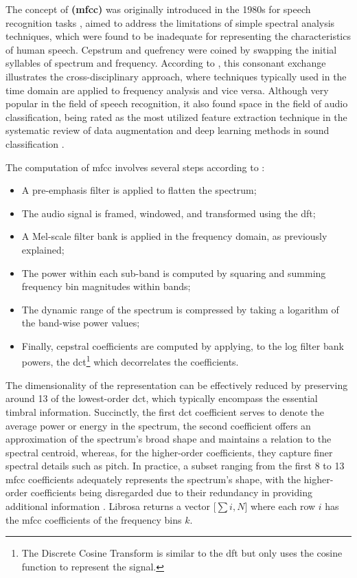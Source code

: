 The concept of \textbf{ (\gls{mfcc})} was originally introduced in the 1980s for speech recognition tasks \cite{DavisMermelstein1980}, aimed to address the limitations of simple spectral analysis techniques, which were found to be inadequate for representing the characteristics of human speech. Cepstrum and quefrency were coined by swapping the initial syllables of spectrum and frequency. According to \textcite{Oppenheim2004}, this consonant exchange illustrates the cross-disciplinary approach, where techniques typically used in the time domain are applied to frequency analysis and vice versa. Although very popular in the field of speech recognition, it also found space in the field of audio classification, being rated as the most utilized feature extraction technique in the systematic review of data augmentation and deep learning methods in sound classification \cite{Alli2022}.

The computation of \gls{mfcc} involves several steps according to \textcite{Klapuri2006}:

\begin{itemize}
    \item A pre-emphasis filter is applied to flatten the spectrum;
    \item The audio signal is framed, windowed, and transformed using the \gls{dft};
    \item A Mel-scale filter bank is applied in the frequency domain, as previously explained;
    \item The power within each sub-band is computed by squaring and summing frequency bin magnitudes within bands;
    \item The dynamic range of the spectrum is compressed by taking a logarithm of the band-wise power values;
    \item Finally, cepstral coefficients are computed by applying, to the log filter bank powers, the \gls{dct}\footnote{The Discrete Cosine Transform is similar to the \gls{dft} but only uses the cosine function to represent the signal.} which decorrelates the coefficients.
\end{itemize}

The dimensionality of the representation can be effectively reduced by preserving around 13 of the lowest-order \gls{dct}, which typically encompass the essential timbral information. Succinctly, the first \gls{dct} coefficient serves to denote the average power or energy in the spectrum, the second coefficient offers an approximation of the spectrum's broad shape and maintains a relation to the spectral centroid, whereas, for the higher-order coefficients, they capture finer spectral details such as pitch. In practice, a subset ranging from the first 8 to 13 \gls{mfcc} coefficients adequately represents the spectrum's shape, with the higher-order coefficients being disregarded due to their redundancy in providing additional information \cite{Abreha2014}. Librosa returns a vector [$\sum i, N$] where each row $i$ has the \gls{mfcc} coefficients of the frequency bins $k$.

